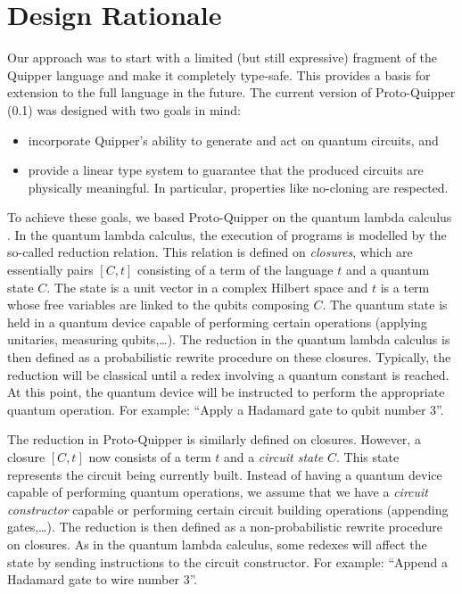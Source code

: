 \documentclass[twoside]{article}
\begin{document}
\section{Design Rationale}

Our approach was to start with a limited (but still expressive) 
fragment of the Quipper language and make it completely type-safe. 
This provides a basis for extension to the full language in the 
future. The current version of Proto-Quipper (0.1) was designed 
with two goals in mind: 
\begin{itemize}
  \item incorporate Quipper's ability to generate and act on 
  quantum circuits, and 
  \item provide a linear type system to guarantee that the 
  produced circuits are physically meaningful. In particular, 
  properties like no-cloning are respected.
\end{itemize}
To achieve these goals, we based Proto-Quipper on the quantum 
lambda calculus {\cite{SeVa09}}. In the quantum lambda calculus, the execution 
of programs is modelled by the so-called reduction relation. This 
relation is defined on \emph{closures}, which are 
essentially pairs $[C,t]$ consisting of a term of the language 
$t$ and a quantum state $C$. The state is a unit vector in a 
complex Hilbert space and $t$ is a term whose free variables are 
linked to the qubits composing $C$. The quantum state is held in 
a quantum device capable of performing certain operations 
(applying unitaries, measuring qubits,\ldots). The reduction in 
the quantum lambda calculus is then defined as a probabilistic rewrite procedure on 
these closures. Typically, the reduction will be classical until 
a redex involving a quantum constant is reached. At this point, 
the quantum device will be instructed to perform the appropriate 
quantum operation. For example: ``Apply a Hadamard gate to qubit 
number 3''. 

The reduction in Proto-Quipper is similarly defined on closures. 
However, a closure $[C,t]$ now consists of a term $t$ and a 
\emph{circuit state} $C$. This state represents the circuit being 
currently built. Instead of having a quantum device capable of 
performing quantum operations, we assume that we have a 
\emph{circuit constructor} capable or performing certain circuit 
building operations (appending gates,\ldots). The reduction is 
then defined as a non-probabilistic rewrite procedure on closures. 
As in the quantum lambda calculus, some redexes will affect the state by sending 
instructions to the circuit constructor. For example: ``Append a 
Hadamard gate to wire number 3''.
\end{document}
